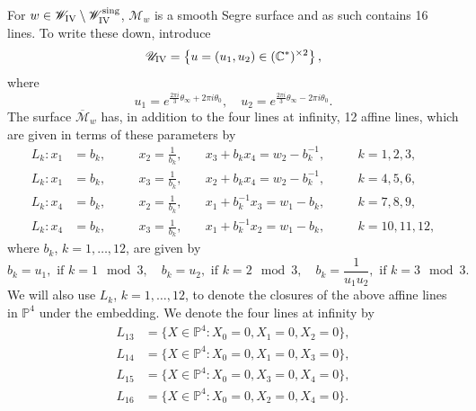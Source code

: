 \documentclass[a4paper,reqno]{amsart}
\numberwithin{equation}{section}
\newcommand{\C}{\mathbb{C}}
\newcommand{\p}{\mathbb{P}}
\numberwithin{equation}{section}
\begin{document}
For $w\in \mathscr{W}_{\rm{IV}}\setminus \mathscr{W}_{\rm{IV}}^{\operatorname{sing}}$, $\mathcal{M}_{w}$ is a smooth Segre surface and as such contains 16 lines.
To write these down, introduce
$$\mathscr{U}_{\rm{IV}} = \left\{ u = (u_1,u_2) \in (\C^{*})^{\times 2} \right\},$$
where 
\begin{equation}\label{eq:thetatouPIV}
    u_1=e^{ \frac{2\pi i}{3}\theta_\infty+ 2 \pi i\theta_0}, \quad u_2=e^{\frac{2\pi i}{3}\theta_\infty-2\pi i\theta_0}.
\end{equation}
The surface $\overline{\mathcal{M}}_w$ has, in addition to the four lines at infinity, 12 affine lines, which are given in terms of these parameters by
\begin{equation} \label{eq:linesPIV}
\begin{aligned}
    L_k : x_1 &= b_k,\quad &&x_2= \frac{1}{b_k},\quad &x_3  + b_k x_4  = w_2 - b_k^{-1}, \quad &&k=1,2,3,\\
    L_k : x_1 &= b_k,\quad &&x_3= \frac{1}{b_k},\quad &x_2  + b_k x_4  = w_2 - b_k^{-1}, \quad &&k=4,5,6,\\
    L_k : x_4 &= b_k,\quad &&x_2= \frac{1}{b_k},\quad &x_1 + b_k^{-1} x_3 = w_1 - b_k, \quad &&k=7,8,9,    \\
    L_k : x_4 &= b_k,\quad &&x_3= \frac{1}{b_k},\quad &x_1 + b_k^{-1} x_2  = w_1 - b_k, \quad &&k=10,11,12,    
    \end{aligned}
    \end{equation}
where $b_k$, $k=1,\dots,12$, are given by
\begin{equation*} 
    b_k = u_1, \text{ if } k = 1 \mod 3 , \quad 
    b_k = u_2, \text{ if } k = 2 \mod 3, \quad 
    b_k = \frac{1}{u_1u_2}, \text{ if } k = 3 \mod 3.
\end{equation*}    
We will also use $L_k$, $k=1,\dots,12$, to denote the closures of the above affine lines in $\p^4$ under the embedding.
We denote the four lines at infinity by
\begin{equation} \label{eq:linesatinfinityPIV}
\begin{aligned}
    L_{13} &= \{X \in \p^4 : X_0=0, X_1=0,X_2=0\},\\
    L_{14} &= \{X \in \p^4 : X_0=0, X_1=0,X_3=0\},\\
    L_{15} &= \{X \in \p^4 : X_0=0, X_3=0,X_4=0\},\\
    L_{16} &= \{X \in \p^4 : X_0=0, X_2=0,X_4=0\}.
\end{aligned}
\end{equation}
\end{document}
